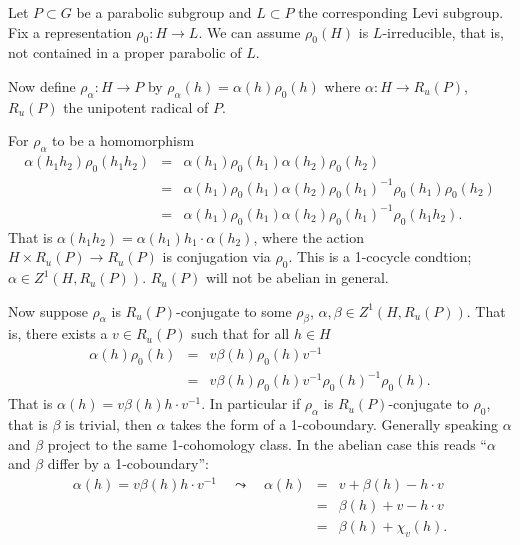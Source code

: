 Let $P \subset G$ be a parabolic subgroup and $L \subset P$ the corresponding Levi subgroup. Fix a representation $\rho_0:H\rightarrow L$. We can assume $\rho_0(H)$ is $L$-irreducible, that is, not contained in a proper parabolic of $L$. 

Now define $\rho_\alpha:H \rightarrow P$ by $\rho_\alpha(h) = \alpha(h)\rho_0(h)$ where $\alpha:H\rightarrow R_u(P)$, $R_u(P)$ the unipotent radical of $P$. 

For $\rho_\alpha$ to be a homomorphism
\begin{eqnarray*}
	\alpha(h_1h_2)\rho_0(h_1h_2) &=& \alpha(h_1)\rho_0(h_1)\alpha(h_2)\rho_0(h_2) \\
	 &=& \alpha(h_1)\rho_0(h_1)\alpha(h_2)\rho_0(h_1)^{-1}\rho_0(h_1)\rho_0(h_2) \\
	 &=& \alpha(h_1)\rho_0(h_1)\alpha(h_2)\rho_0(h_1)^{-1}\rho_0(h_1h_2).
\end{eqnarray*}
That is $\alpha(h_1h_2) = \alpha(h_1) h_1\cdot\alpha(h_2)$, where the action $H \times R_u(P) \rightarrow R_u(P)$ is conjugation via $\rho_0$. This is a 1-cocycle condtion; $\alpha\in Z^1(H, R_u(P))$. $R_u(P)$ will not be abelian in general.

Now suppose $\rho_\alpha$ is $R_u(P)$-conjugate to some $\rho_\beta$, $\alpha, \beta \in Z^1(H, R_u(P))$. That is, there exists a $v \in R_u(P)$ such that for all $h\in H$
\begin{eqnarray*}
	\alpha(h)\rho_0(h) &=& v\beta(h)\rho_0(h)v^{-1} \\
	&=& v\beta(h)\rho_0(h)v^{-1}\rho_0(h)^{-1}\rho_0(h).
\end{eqnarray*}
That is $\alpha(h) = v\beta(h)h\cdot v^{-1}$. In particular if $\rho_\alpha$ is $R_u(P)$-conjugate to $\rho_0$, that is $\beta$ is trivial, then $\alpha$ takes the form of a 1-coboundary. Generally speaking $\alpha$ and $\beta$ project to the same 1-cohomology class. In the abelian case this reads ``$\alpha$ and $\beta$ differ by a 1-coboundary'':
\begin{eqnarray*}
	\alpha(h) = v\beta(h)h\cdot v^{-1} \quad\leadsto \quad\alpha(h) &=& v + \beta(h) - h\cdot v \\
	&=& \beta(h) + v - h\cdot v \\
	&=& \beta(h) + \chi_v(h).
\end{eqnarray*}

